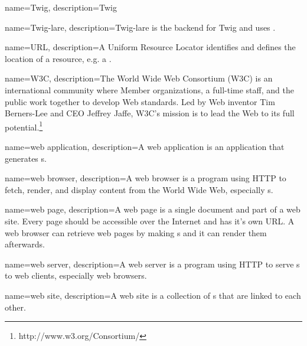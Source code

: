 {
  name=Twig,
  description={Twig}
}

{
  name=Twig-lare,
  description={Twig-lare is the \lare{} backend for Twig and uses \phpLare{}.}
}

{
  name=URL,
  description={A Uniform Resource Locator identifies and defines the location of a resource, e.g. a \webPage{}.}
}

{
  name=W3C,
  description={The World Wide Web Consortium (W3C) is an international community where Member organizations, a full-time staff, and the public work together to develop Web standards. Led by Web inventor Tim Berners-Lee and CEO Jeffrey Jaffe, W3C's mission is to lead the Web to its full potential.\footnote{http://www.w3.org/Consortium/}}
}

{
  name=web application,
  description={A web application is an application that generates \webPage{}s.}
}

{
  name=web browser,
  description={A web browser is a program using HTTP to fetch, render, and display content from the World Wide Web, especially \webPage{}s.}
}

{
  name=web page,
  description={A web page is a single document and part of a web site. 
  Every page should be accessible over the Internet and has it's own URL.
  A web browser can retrieve web pages by making \httpRequest{}s and it can render them afterwards.}
}

{
  name=web server,
  description={A web server is a program using HTTP to serve \webPage{}s to web clients, especially web browsers.}
}

{
  name=web site,
  description={A web site is a collection of \webPage{}s that are linked to each other.}
}

